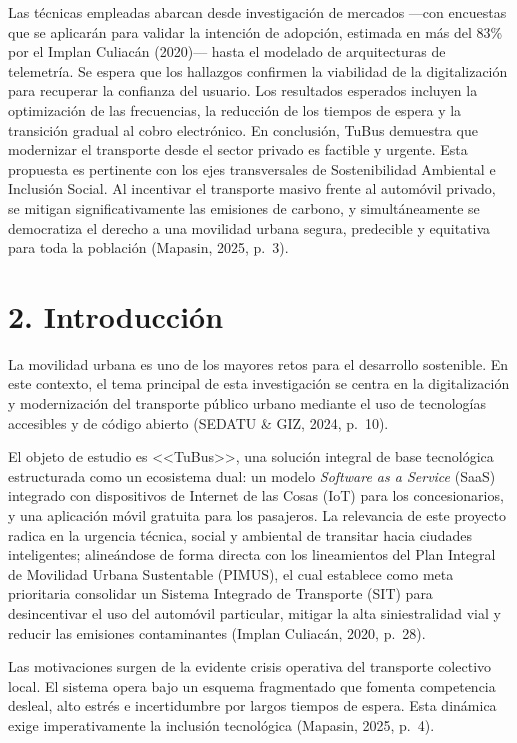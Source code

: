 \documentclass[12pt,letterpaper]{article}
\newcommand{\seccion}[1]{%
  \section*{#1}\addcontentsline{toc}{section}{#1}}
\begin{document}
Las técnicas empleadas abarcan desde investigación de mercados ---con encuestas
que se aplicarán para validar la intención de adopción, estimada en más del
83\% por el Implan Culiacán (2020)--- hasta el modelado de arquitecturas de
telemetría. Se espera que los hallazgos confirmen la viabilidad de la
digitalización para recuperar la confianza del usuario. Los resultados
esperados incluyen la optimización de las frecuencias, la reducción de los
tiempos de espera y la transición gradual al cobro electrónico. En conclusión,
TuBus demuestra que modernizar el transporte desde el sector privado es
factible y urgente. Esta propuesta es pertinente con los ejes transversales de
Sostenibilidad Ambiental e Inclusión Social. Al incentivar el transporte masivo
frente al automóvil privado, se mitigan significativamente las emisiones de
carbono, y simultáneamente se democratiza el derecho a una movilidad urbana
segura, predecible y equitativa para toda la población (Mapasin, 2025, p.~3).

\seccion{2. Introducción}

La movilidad urbana es uno de los mayores retos para el desarrollo sostenible.
En este contexto, el tema principal de esta investigación se centra en la
digitalización y modernización del transporte público urbano mediante el uso de
tecnologías accesibles y de código abierto (SEDATU \& GIZ, 2024, p.~10).

El objeto de estudio es <<TuBus>>, una solución integral de base tecnológica
estructurada como un ecosistema dual: un modelo \textit{Software as a Service}
(SaaS) integrado con dispositivos de Internet de las Cosas (IoT) para los
concesionarios, y una aplicación móvil gratuita para los pasajeros. La
relevancia de este proyecto radica en la urgencia técnica, social y ambiental de
transitar hacia ciudades inteligentes; alineándose de forma directa con los
lineamientos del Plan Integral de Movilidad Urbana Sustentable (PIMUS), el cual
establece como meta prioritaria consolidar un Sistema Integrado de Transporte
(SIT) para desincentivar el uso del automóvil particular, mitigar la alta
siniestralidad vial y reducir las emisiones contaminantes (Implan Culiacán,
2020, p.~28).

Las motivaciones surgen de la evidente crisis operativa del transporte
colectivo local. El sistema opera bajo un esquema fragmentado que fomenta
competencia desleal, alto estrés e incertidumbre por largos tiempos de espera.
Esta dinámica exige imperativamente la inclusión tecnológica (Mapasin, 2025,
p.~4).
\end{document}
